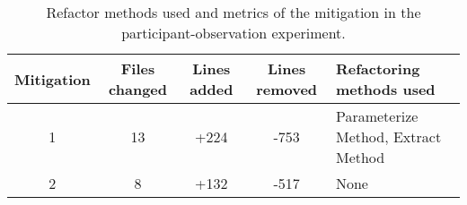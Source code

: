 \begin{table}
\begin{tabular}{ | c | c | c | c | m{6em} | }

\hline

\textbf{Mitigation} & \textbf{Files changed} & \textbf{Lines added} & \textbf{Lines removed} & \textbf{Refactoring methods used}
\\ \hline 

1 & 13 & +224 & -753 & Parameterize Method, Extract Method  \\ \hline
2 & 8 & +132 & -517 & None \\ \hline

\hline
\end{tabular}
\caption{Refactor methods used and metrics of the mitigation in the participant-observation experiment.}
\label{tab:patch}
\end{table}
